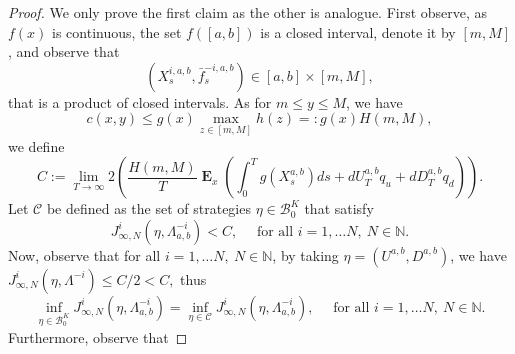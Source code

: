 \documentclass{article}
\newcommand\E{\operatorname{\mathbf{E}}}
\begin{document}
\begin{proof}
    We only prove the first claim as the other is analogue.
    First observe, as $f(x)$ is continuous, the set $f([a,b])$ is a closed interval, denote it by $[m,M]$,
and  observe that 
$$
(X^{i,a,b}_s,\bar f^{-i,a,b}_s)\in [a,b]\times[m,M], 
$$
that is a product of closed intervals. 
As for $m \leq y \leq M$, we have   
%
\begin{equation}\label{eq:cbounded}
    c(x,y) \leq g(x)\max_{z \in [m,M]}h(z)  =: g(x)H(m,M)  ,
\end{equation}
we define
 $$C:= \lim_{T \to \infty} 2 \left( \frac{H(m,M)}{T}\E_x \left( \int_0^T g ( X^{a,b}_s ) ds +dU_T^{a,b}q_u+dD_T^{a,b}q_d \right) \right) . $$
%
  Let $\mathcal{C}$ be defined as the set of strategies $\eta \in \mathcal{B}^K_0$ that satisfy 
  $$J_{\infty,N}^i (\eta, \Lambda^{-i}_{a,b})<C , \quad \text{ for all } i=1, \dots N, \ N \in \mathbb{N}. $$
 Now, observe that for all $i=1, \dots N, \ N \in \mathbb{N}$, by taking $\eta = (U^{a,b},D^{a,b})$, we have  $ J_{\infty,N}^i (\eta,\Lambda^{-i})\leq C/2< C ,$ thus
\begin{equation*}
    \inf_{\eta \in \mathcal{B}^K_0} J_{\infty,N}^i (\eta,\Lambda^{-i}_{a,b})=   \inf_{\eta \in \mathcal{C}} J_{\infty,N}^i (\eta,\Lambda^{-i}_{a,b}), \quad \text{ for all } i=1, \dots N, \ N \in \mathbb{N}.  
\end{equation*}
Furthermore, observe that


\end{proof}
\end{document}
